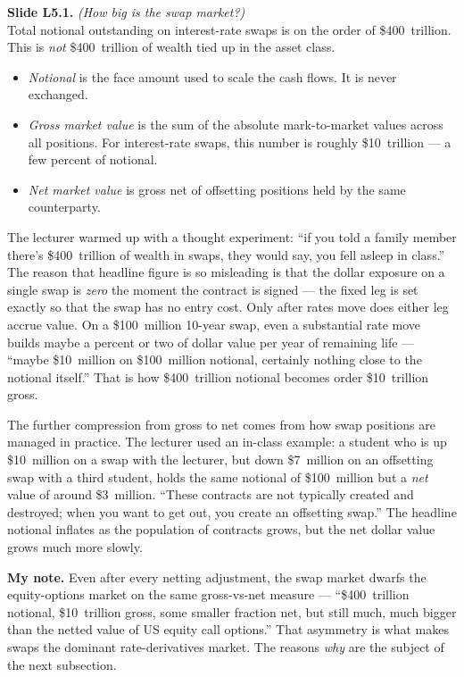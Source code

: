 \begin{keyblock}
\textbf{Slide L5.1.} \emph{(How big is the swap market?)}\\
Total notional outstanding on interest-rate swaps is on the order of
\$400~trillion. This is \emph{not} \$400~trillion of wealth tied up
in the asset class.
\begin{itemize}
  \item \emph{Notional} is the face amount used to scale the cash flows.
        It is never exchanged.
  \item \emph{Gross market value} is the sum of the absolute mark-to-market
        values across all positions. For interest-rate swaps, this number
        is roughly \$10~trillion --- a few percent of notional.
  \item \emph{Net market value} is gross net of offsetting positions held
        by the same counterparty.
\end{itemize}
\end{keyblock}

The lecturer warmed up with a thought experiment: ``if you told a
family member there's \$400~trillion of wealth in swaps, they would
say, you fell asleep in class.'' The reason that headline figure is so
misleading is that the dollar exposure on a single swap is
\emph{zero} the moment the contract is signed --- the fixed leg is set
exactly so that the swap has no entry cost. Only after rates move does
either leg accrue value. On a \$100~million 10-year swap, even a
substantial rate move builds maybe a percent or two of dollar value per
year of remaining life --- ``maybe \$10~million on \$100~million
notional, certainly nothing close to the notional itself.'' That is
how \$400~trillion notional becomes order \$10~trillion gross.

The further compression from gross to net comes from how swap
positions are managed in practice. The lecturer used an in-class
example: a student who is up \$10~million on a swap with the lecturer,
but down \$7~million on an offsetting swap with a third student, holds
the same notional of \$100~million but a \emph{net} value of around
\$3~million. ``These contracts are not typically created and
destroyed; when you want to get out, you create an offsetting swap.''
The headline notional inflates as the population of contracts grows,
but the net dollar value grows much more slowly.

\begin{checkpoint}
\textbf{My note.} Even after every netting adjustment, the swap market
dwarfs the equity-options market on the same gross-vs-net measure ---
``\$400~trillion notional, \$10~trillion gross, some smaller fraction
net, but still much, much bigger than the netted value of US equity
call options.'' That asymmetry is what makes swaps the dominant
rate-derivatives market. The reasons \emph{why} are the subject of the
next subsection.
\end{checkpoint}

